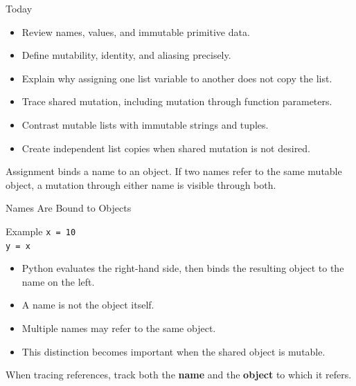 \documentclass[aspectratio=169,10pt]{beamer}
\begin{document}
\makedecktitle

\begin{frame}{Today}
  \begin{itemize}
    \item Review names, values, and immutable primitive data.
    \item Define mutability, identity, and aliasing precisely.
    \item Explain why assigning one list variable to another does not copy the list.
    \item Trace shared mutation, including mutation through function parameters.
    \item Contrast mutable lists with immutable strings and tuples.
    \item Create independent list copies when shared mutation is not desired.
  \end{itemize}

  \begin{keyidea}
    Assignment binds a name to an object. If two names refer to the same mutable object, a mutation through either name is visible through both.
  \end{keyidea}
\end{frame}


\begin{frame}{Names Are Bound to Objects}
  \begin{block}{Example}
    \texttt{x = 10}\\
    \texttt{y = x}
  \end{block}

  \begin{itemize}
    \item Python evaluates the right-hand side, then binds the resulting object to the name on the left.
    \item A name is not the object itself.
    \item Multiple names may refer to the same object.
    \item This distinction becomes important when the shared object is mutable.
  \end{itemize}

  \begin{keyidea}
    When tracing references, track both the \textbf{name} and the \textbf{object} to which it refers.
  \end{keyidea}
\end{frame}
\end{document}
